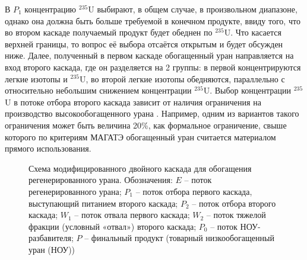 В $P_1$ концентрацию $^{235}$U выбирают, в общем случае, в произвольном диапазоне, однако она должна быть больше требуемой в конечном продукте, ввиду того, что во втором каскаде получаемый продукт будет обеднен по $^{235}$U. Что касается верхней границы, то вопрос её выбора отсаётся открытым и будет обсужден ниже.  Далее, полученный в первом каскаде обогащенный уран направляется на вход второго каскада, где он разделяется на 2 группы: в первой концентрируются легкие изотопы и $^{235}$U, во второй легкие изотопы обедняются, параллельно с относительно небольшим снижением концентрации $^{235}$U. Выбор концентрации $^{235}$U в потоке отбора второго каскада зависит от наличия ограничения на производство высокообогащенного урана \cite{brownOriginsSignificanceLimit2016}. Например, одним из вариантов такого ограничения может быть величина 20\%, как формальное ограничение, свыше которого по критериям МАГАТЭ обогащенный уран считается материалом прямого использования.

\begin{figure}[ht]
    \caption{Схема модифицированного двойного каскада для обогащения регенерированного урана. Обозначения: $E$ -- поток регенерированного урана; $P_1$ -- поток отбора первого каскада, выступающий питанием второго каскада; $P_2$ -- поток отбора второго каскада; $W_1$ -- поток отвала первого каскада; $W_2$ -- поток тяжелой фракции (условный «отвал») второго каскада; $P_0$ -- поток НОУ-разбавителя; $P$ -- финальный продукт (товарный низкообогащенный уран (НОУ))}\label{p2left}
\end{figure}

